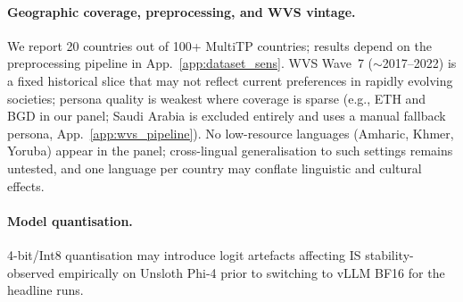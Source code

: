 \documentclass{article}
\begin{document}
\paragraph{Geographic coverage, preprocessing, and WVS vintage.}
We report 20 countries out of 100+ MultiTP countries; results depend on the preprocessing pipeline in App.~\ref{app:dataset_sens}. WVS Wave~7 ($\sim$2017--2022) is a fixed historical slice that may not reflect current preferences in rapidly evolving societies; persona quality is weakest where coverage is sparse (e.g., ETH and BGD in our panel; Saudi Arabia is excluded entirely and uses a manual fallback persona, App.~\ref{app:wvs_pipeline}). No low-resource languages (Amharic, Khmer, Yoruba) appear in the panel; cross-lingual generalisation to such settings remains untested, and one language per country may conflate linguistic and cultural effects.

\paragraph{Model quantisation.}
4-bit/Int8 quantisation may introduce logit artefacts affecting IS stability-observed empirically on Unsloth Phi-4 prior to switching to vLLM BF16 for the headline runs.

\newpage

\end{document}
